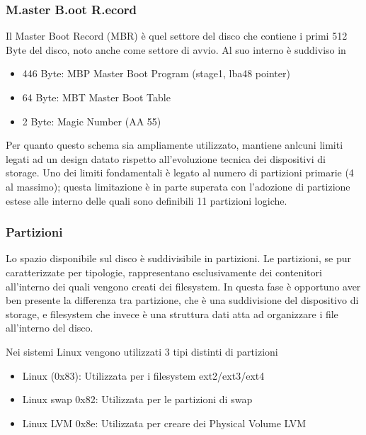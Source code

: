 \subsubsection{M.aster B.oot R.ecord}

Il Master Boot Record (MBR) è quel settore del disco che contiene i primi 512 Byte del disco, noto anche come settore di avvio.  Al suo interno è suddiviso in 

\begin{itemize}
 \item 446 Byte: MBP Master Boot Program (stage1, lba48 pointer)
 \item 64 Byte: MBT Master Boot Table
 \item 2 Byte: Magic Number (AA 55)
\end{itemize}


Per quanto questo schema sia ampliamente utilizzato, mantiene anlcuni limiti legati ad un design datato rispetto all'evoluzione tecnica dei dispositivi di storage. 
Uno dei limiti fondamentali è legato al numero di partizioni primarie (4 al massimo); questa limitazione è in parte superata con l'adozione di partizione estese alle interno delle quali sono definibili 11 partizioni logiche. 


\subsubsection{Partizioni}

Lo spazio disponibile sul disco è suddivisibile in partizioni. Le partizioni, se pur caratterizzate per tipologie, rappresentano esclusivamente dei contenitori all'interno dei quali vengono creati dei filesystem. 
In questa fase è opportuno aver ben presente la differenza tra partizione, che è una suddivisione del dispositivo di storage, e filesystem che invece è una struttura dati atta ad organizzare i file all'interno del disco.

Nei sistemi Linux vengono utilizzati 3 tipi distinti di partizioni 

\begin{itemize}
 \item Linux (0x83): Utilizzata per i filesystem ext2/ext3/ext4 
 \item Linux swap 0x82: Utilizzata per le partizioni di swap
 \item Linux LVM 0x8e: Utilizzata per creare dei Physical Volume LVM
\end{itemize}

